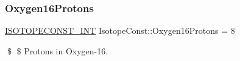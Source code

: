 \subsubsection{\texorpdfstring{Oxygen16\+Protons}{Oxygen16Protons}}
{\footnotesize\ttfamily \mbox{\hyperlink{group___isotope_const-_macros_ga5f18360b3e99483a35c32d789e62621c}{I\+S\+O\+T\+O\+P\+E\+C\+O\+N\+S\+T\+\_\+\+I\+NT}} Isotope\+Const\+::\+Oxygen16\+Protons = 8}

\$ \$ Protons in Oxygen-\/16. 